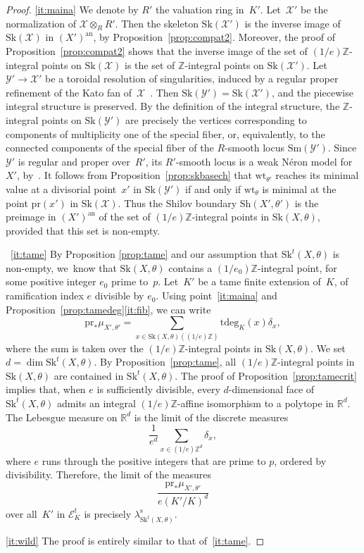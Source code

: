 \documentclass[JEP,XML,SOM,Unicode,NoFloatCountersInSection]{cedram}
\let\mathcal\mathscr
\theoremstyle{definition}
\numberwithin{equation}{subsection}
\newcommand{\Z}{\ensuremath{\mathbb{Z}}}
\newcommand{\R}{\ensuremath{\mathbb{R}}}
\newcommand{\cX}{\ensuremath{\mathscr{X}}}
\newcommand{\cY}{\ensuremath{\mathscr{Y}}}
\newcommand{\an}{\mathrm{an}}
\newcommand{\pr}{\mathrm{pr}}
\newcommand{\Sh}{\mathrm{Sh}}
\newcommand{\Sk}{\mathrm{Sk}}
\newcommand{\Sm}{\mathrm{Sm}}
\newcommand{\rs}{\mathrm{s}}
\newcommand{\tdeg}{\mathrm{tdeg}}
\newcommand{\wt}{\mathrm{wt}}
\let\form\theta
\let\Leb\lambda
\begin{document}
\skpt
\begin{proof}
\eqref{it:maina} We denote by $R'$ the valuation ring in~$K'$.
Let~$\cX'$ be the normalization of $\cX\otimes_R R'$. Then the skeleton $\Sk(\cX')$ is the inverse image of $\Sk(\cX)$ in $(X')^{\an}$, by Proposition~\ref{prop:compat2}. Moreover, the proof of Proposition~\ref{prop:compat2} shows that the inverse image of the set of $(1/e)\Z$-integral points on $\Sk(\cX)$ is the set of $\Z$-integral points on $\Sk(\cX')$. Let $\cY'\to \cX'$ be a toroidal resolution of singularities, induced by a regular proper refinement of the Kato fan of~$\cX$~\cite[\S10]{kato}.
Then $\Sk(\cY')=\Sk(\cX')$, and the piecewise integral structure is preserved. By the definition of the integral structure, the $\Z$-integral points
on $\Sk(\cY')$ are precisely the vertices corresponding to components of multiplicity one of the special fiber, or, equivalently, to the connected components of
the special fiber of the $R$\nobreakdash-smooth locus $\Sm(\cY')$. Since $\cY'$ is regular and proper over~$R'$, its $R'$-smooth locus is a weak Néron model for $X'$, by~\cite[3.1/2]{BLR}. It follows from Proposition~\ref{prop:skbasech} that $\wt_{\form'}$ reaches its minimal value at a divisorial point~$x'$ in $\Sk(\cY')$ if and only if
$\wt_{\form}$ is minimal at the point $\pr(x')$ in $\Sk(\cX)$. Thus the Shilov boundary $\Sh(X',\form')$ is the preimage in $(X')^{\an}$ of the set of $(1/e)\Z$-integral points in $\Sk(X,\form)$, provided that this set is non-empty.

~\eqref{it:tame}
By Proposition \ref{prop:tame} and our assumption that $\Sk^t(X,\form)$ is non-empty, we~know that $\Sk(X,\form)$ contains a $(1/e_0)\Z$-integral point, for some positive integer $e_0$ prime to~$p$.
Let~$K'$ be a tame finite extension of~$K$, of ramification index $e$ divisible by $e_0$.
Using point~\eqref{it:maina} and Proposition~\ref{prop:tamedeg}\eqref{it:fib}, we can write
\[
\pr_\ast\mu_{X',\form'}=\sum_{x\in \Sk(X,\form)((1/e)\Z)} \tdeg_K(x)\delta_x,
\]
where the sum is taken over the $(1/e)\Z$-integral points in $\Sk(X,\form)$.
We set $d=\dim \Sk^t(X,\form)$.
By Proposition~\ref{prop:tame}, all $(1/e)\Z$-integral points in $\Sk(X,\form)$ are contained in $\Sk^t(X,\form)$.
The proof of Proposition~\ref{prop:tamecrit} implies that,
when $e$ is sufficiently divisible, every
$d$-dimensional face of $\Sk^t(X,\form)$ admits an integral $(1/e)\Z$-affine isomorphism
to a polytope in $\R^d$.
The Lebesgue measure on $\R^d$ is the limit of the discrete measures
\[
\frac{1}{e^d}\sum_{x\in (1/e)\Z^d}\delta_x,
\]
where $e$ runs through the positive integers that are prime to $p$, ordered by divisibility.
Therefore,
the limit of the measures
\[
\frac{\pr_\ast\mu_{X',\form'}}{e(K'/K)^{d}}
\]
over all~$K'$ in $\mathcal{E}^t_K$ is precisely
$\Leb^{\rs}_{\Sk^t(X,\form)}$.

\eqref{it:wild} The proof is entirely similar to that of~\eqref{it:tame}.
\end{proof}
\end{document}
